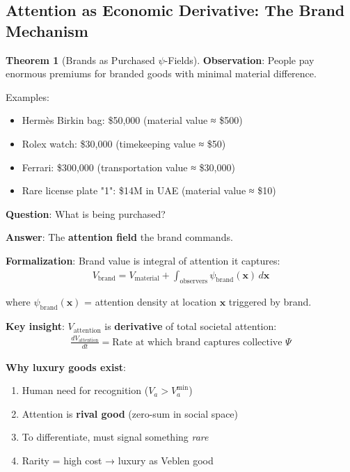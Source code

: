 \documentclass[11pt,a4paper]{article}
\theoremstyle{definition}
\newtheorem{theorem}{Theorem}[section]
\theoremstyle{remark}
\begin{document}
\begin{enumerate}
\subsection{Attention as Economic Derivative: The Brand Mechanism}

\begin{theorem}[Brands as Purchased \(\psi\)-Fields]
\textbf{Observation}: People pay enormous premiums for branded goods with minimal material difference.

Examples:
\begin{itemize}
    \item Hermès Birkin bag: \$50,000 (material value ≈ \$500)
    \item Rolex watch: \$30,000 (timekeeping value ≈ \$50)
    \item Ferrari: \$300,000 (transportation value ≈ \$30,000)
    \item Rare license plate "1": \$14M in UAE (material value ≈ \$10)
\end{itemize}

\textbf{Question}: What is being purchased?

\textbf{Answer}: The \textbf{attention field} the brand commands.

\textbf{Formalization}: Brand value is integral of attention it captures:
\begin{align}
V_{\text{brand}} = V_{\text{material}} + \int_{\text{observers}} \psi_{\text{brand}}(\mathbf{x}) \, d\mathbf{x}
\end{align}

where \(\psi_{\text{brand}}(\mathbf{x})\) = attention density at location \(\mathbf{x}\) triggered by brand.

\textbf{Key insight}: \(V_{\text{attention}}\) is \textbf{derivative} of total societal attention:
\begin{align}
\frac{dV_{\text{attention}}}{dt} = \text{Rate at which brand captures collective } \Psi
\end{align}

\textbf{Why luxury goods exist}:
\begin{enumerate}
    \item Human need for recognition (\(V_a > V_a^{\min}\))
    \item Attention is \textbf{rival good} (zero-sum in social space)
    \item To differentiate, must signal something \textit{rare}
    \item Rarity = high cost → luxury as Veblen good
\end{enumerate}


\end{theorem}
\end{enumerate}
\end{document}
